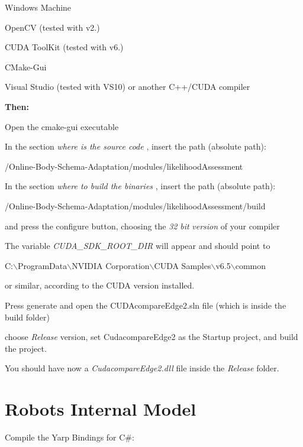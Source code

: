 \begin{DoxyItemize}
\item Windows Machine
\item Open\+CV (tested with v2.)
\item C\+U\+DA Tool\+Kit (tested with v6.)
\item C\+Make-\/\+Gui
\item Visual Studio (tested with V\+S10) or another C++/\+C\+U\+DA compiler
\end{DoxyItemize}

{\bfseries Then\+:} 

Open the cmake-\/gui executable



In the section {\itshape  where is the source code }, insert the path (absolute path)\+: 
\begin{DoxyCode}
/Online-Body-Schema-Adaptation/modules/likelihoodAssessment 
\end{DoxyCode}
 In the section {\itshape  where to build the binaries }, insert the path (absolute path)\+: 
\begin{DoxyCode}
/Online-Body-Schema-Adaptation/modules/likelihoodAssessment/build 
\end{DoxyCode}
 and press the configure button, choosing the {\itshape 32} {\itshape bit} {\itshape version} of your compiler

The variable {\itshape  C\+U\+D\+A\+\_\+\+S\+D\+K\+\_\+\+R\+O\+O\+T\+\_\+\+D\+IR } will appear and should point to 
\begin{DoxyCode}
C:\(\backslash\)ProgramData\(\backslash\)NVIDIA Corporation\(\backslash\)CUDA Samples\(\backslash\)v6.5\(\backslash\)common 
\end{DoxyCode}
 or similar, according to the C\+U\+DA version installed.

Press generate and open the C\+U\+D\+Acompare\+Edge2.\+sln file (which is inside the build folder)

choose {\itshape Release} version, set Cudacompare\+Edge2 as the Startup project, and build the project.

You should have now a {\itshape Cudacompare\+Edge2.\+dll} file inside the {\itshape Release} folder.\hypertarget{installation_internalmode_sec}{}\section{Robot\textquotesingle{}s Internal Model}\label{installation_internalmode_sec}
Compile the Yarp Bindings for C\#\+:

